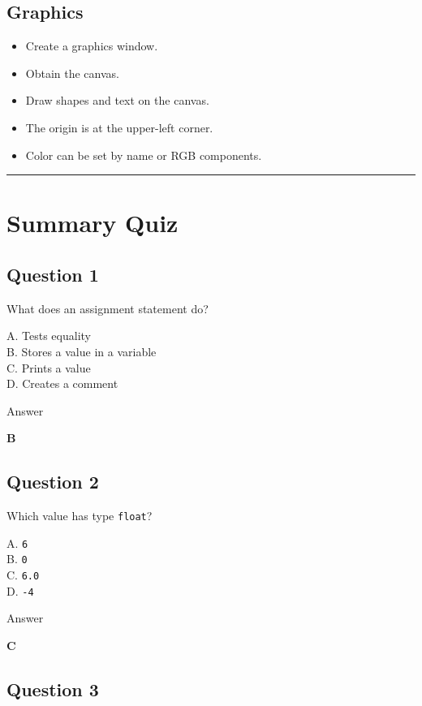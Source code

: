 \documentclass[
]{article}
\providecommand{\tightlist}{%
  \setlength{\itemsep}{0pt}\setlength{\parskip}{0pt}}
\begin{document}
\subsection{Graphics}\label{graphics}

\begin{itemize}
\tightlist
\item
  Create a graphics window.
\item
  Obtain the canvas.
\item
  Draw shapes and text on the canvas.
\item
  The origin is at the upper-left corner.
\item
  Color can be set by name or RGB components.
\end{itemize}

\begin{center}\rule{0.5\linewidth}{0.5pt}\end{center}

\section{Summary Quiz}\label{summary-quiz}

\subsection{Question 1}\label{question-1-5}

What does an assignment statement do?

A. Tests equality\\
B. Stores a value in a variable\\
C. Prints a value\\
D. Creates a comment

Answer

\textbf{B}

\subsection{Question 2}\label{question-2-5}

Which value has type \texttt{float}?

A. \texttt{6}\\
B. \texttt{0}\\
C. \texttt{6.0}\\
D. \texttt{-4}

Answer

\textbf{C}

\subsection{Question 3}\label{question-3-5}
\end{document}
